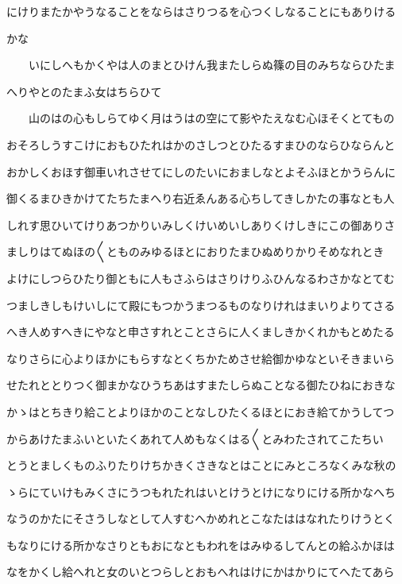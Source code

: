 \documentclass[a4paper,11pt,landscape]{ltjtarticle}
\begin{document}
にけりまたかやうなることをならはさりつるを心つくしなることにもありける
\par\medskip
かな
\par\medskip
　　いにしへもかくやは人のまとひけん我またしらぬ篠の目のみちならひたま
\par\medskip
へりやとのたまふ女はちらひて
\par\medskip
　　山のはの心もしらてゆく月はうはの空にて影やたえなむ心ほそくとてもの
\par\medskip
おそろしうすこけにおもひたれはかのさしつとひたるすまひのならひならんと
\par\medskip
おかしくおほす御車いれさせてにしのたいにおましなとよそふほとかうらんに
\par\medskip
御くるまひきかけてたちたまへり右近ゑんある心ちしてきしかたの事なとも人
\par\medskip
しれす思ひいてけりあつかりいみしくけいめいしありくけしきにこの御ありさ
\par\medskip
ましりはてぬほの〱とものみゆるほとにおりたまひぬめりかりそめなれとき
\par\medskip
よけにしつらひたり御ともに人もさふらはさりけりふひんなるわさかなとてむ
\par\medskip
つましきしもけいしにて殿にもつかうまつるものなりけれはまいりよりてさる
\par\medskip
へき人めすへきにやなと申さすれとことさらに人くましきかくれかもとめたる
\par\medskip
なりさらに心よりほかにもらすなとくちかためさせ給御かゆなといそきまいら
\par\medskip
せたれととりつく御まかなひうちあはすまたしらぬことなる御たひねにおきな
\par\medskip
かゝはとちきり給ことよりほかのことなしひたくるほとにおき給てかうしてつ
\par\medskip
からあけたまふいといたくあれて人めもなくはる〱とみわたされてこたちい
\par\medskip
とうとましくものふりたりけちかきくさきなとはことにみところなくみな秋の
\par\medskip
ゝらにていけもみくさにうつもれたれはいとけうとけになりにける所かなへち
\par\medskip
なうのかたにそさうしなとして人すむへかめれとこなたははなれたりけうとく
\par\medskip
もなりにける所かなさりともおになともわれをはみゆるしてんとの給ふかほは
\par\medskip
なをかくし給へれと女のいとつらしとおもへれはけにかはかりにてへたてあら
\par\medskip
\end{document}
